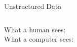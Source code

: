\documentclass[10pt]{beamer}
\begin{document}
\begin{frame}{Unstructured Data}
\begin{columns}
\begin{column}{0.4\textwidth}
  What a \alert{human} sees:
  \\ \vspace{5em}
  What a \alert{computer} sees:
\end{column}
\begin{column}{0.6\textwidth}
\begin{center}
  \\ \vspace{1em}
\end{center}
\end{column}
\end{columns}
\end{frame}
\end{document}

